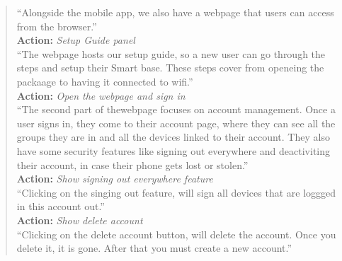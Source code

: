 \documentclass[12pt]{article}
\begin{document}
\begin{quote}
``Alongside the mobile app, we also have a webpage that users can access from the browser.''
\vspace{5px}\\\textbf{Action: }\textit{Setup Guide panel}\vspace{5px}\\
``The webpage hosts our setup guide, so a new user can go through the steps and setup their Smart base. These steps cover from openeing the packaage to having it connected to wifi.''
\vspace{5px}\\\textbf{Action: }\textit{Open the webpage and sign in}\vspace{5px}\\
``The second part of thewebpage  focuses on account management. Once a user signs in, they come to their account page, where they can see all the groups they are in  and all the devices linked to their account. They  also have some security features like signing out everywhere and deactiviting their account, in case their phone gets lost or stolen.''
\vspace{5px}\\\textbf{Action: }\textit{Show signing out everywhere feature}\vspace{5px}\\
``Clicking on the singing out feature, will sign all devices that are loggged in this account out.''
\vspace{5px}\\\textbf{Action: }\textit{Show delete account}\vspace{5px}\\
``Clicking on the delete account button, will delete the account. Once you delete it, it is gone. After that you must create a new account.''\end{quote}

\end{document}
